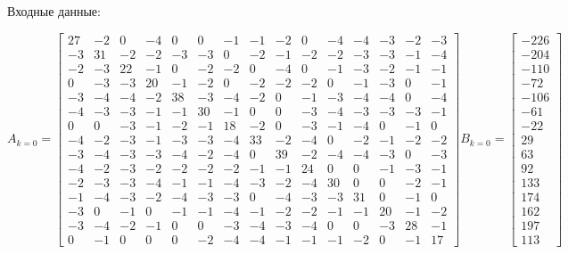 \documentclass[a4paper, 12pt]{article}
\begin{document}
Входные данные: 

\scriptsize
\[
A_{k = 0} = 
\left[{
	\begin{array}{rrrrrrrrrrrrrrr}
	27 & -2 & 0 & -4 & 0 & 0 & -1 & -1 & -2 & 0 & -4 & -4 & -3 & -2 & -3 \\
	-3 & 31 & -2 & -2 & -3 & -3 & 0 & -2 & -1 & -2 & -2 & -3 & -3 & -1 & -4 \\
	-2 & -3 & 22 & -1 & 0 & -2 & -2 & 0 & -4 & 0 & -1 & -3 & -2 & -1 & -1 \\
	0 & -3 & -3 & 20 & -1 & -2 & 0 & -2 & -2 & -2 & 0 & -1 & -3 & 0 & -1 \\
	-3 & -4 & -4 & -2 & 38 & -3 & -4 & -2 & 0 & -1 & -3 & -4 & -4 & 0 & -4 \\
	-4 & -3 & -3 & -1 & -1 & 30 & -1 & 0 & 0 & -3 & -4 & -3 & -3 & -3 & -1	\\
	0 & 0 & -3 & -1 & -2 & -1 & 18 & -2 & 0 & -3 & -1 & -4 & 0 & -1 & 0 \\
	-4 & -2 & -3 & -1 & -3 & -3 & -4 & 33 & -2 & -4 & 0 & -2 & -1 & -2 & -2 \\
	-3 & -4 & -3 & -3 & -4 & -2 & -4 & 0 & 39 & -2 & -4 & -4 & -3 & 0 & -3 \\
	-4 & -2 & -3 & -2 & -2 & -2 & -2 & -1 & -1 & 24 & 0 & 0 & -1 & -3 & -1 \\
	-2 & -3 & -3 & -4 & -1 & -1 & -4 & -3 & -2 & -4 & 30 & 0 & 0 & -2 & -1 \\
	-1 & -4 & -3 & -2 & -4 & -3 & -3 & 0 & -4 & -3 & -3 & 31 & 0 & -1 & 0 \\
	-3 & 0 & -1 & 0 & -1 & -1 & -4 & -1 & -2 & -2 & -1 & -1 & 20 & -1 & -2 \\
	-3 & -4 & -2 & -1 & 0 & 0 & -3 & -4 & -3 & -4 & 0 & 0 & -3 & 28 & -1 \\
	0 & -1 & 0 & 0 & 0 & -2 & -4 & -4 & -1 & -1 & -1 & -2 & 0 & -1 & 17
	\end{array} 
}\right]
B_{k = 0} = 
\left[{
\begin{array}{r}
-226 \\
-204 \\
-110 \\
-72 \\
-106 \\
-61 \\
-22 \\
29 \\
63 \\
92 \\
133 \\
174 \\
162 \\
197 \\
113
\end{array}
}\right]
\]
\end{document}

